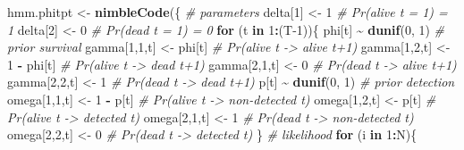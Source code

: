 \documentclass[
  12pt,
]{krantz}
\newenvironment{Shaded}{\begin{snugshade}}{\end{snugshade}}
\newcommand{\CommentTok}[1]{\textcolor[rgb]{0.56,0.35,0.01}{\textit{#1}}}
\newcommand{\ControlFlowTok}[1]{\textcolor[rgb]{0.13,0.29,0.53}{\textbf{#1}}}
\newcommand{\DecValTok}[1]{\textcolor[rgb]{0.00,0.00,0.81}{#1}}
\newcommand{\FunctionTok}[1]{\textcolor[rgb]{0.13,0.29,0.53}{\textbf{#1}}}
\newcommand{\NormalTok}[1]{#1}
\newcommand{\OtherTok}[1]{\textcolor[rgb]{0.56,0.35,0.01}{#1}}
\newcommand{\SpecialCharTok}[1]{\textcolor[rgb]{0.81,0.36,0.00}{\textbf{#1}}}
\begin{document}
\begin{Shaded}
\begin{Highlighting}[]
\NormalTok{hmm.phitpt }\OtherTok{\textless{}{-}} \FunctionTok{nimbleCode}\NormalTok{(\{}
  \CommentTok{\# parameters}
\NormalTok{  delta[}\DecValTok{1}\NormalTok{] }\OtherTok{\textless{}{-}} \DecValTok{1}          \CommentTok{\# Pr(alive t = 1) = 1}
\NormalTok{  delta[}\DecValTok{2}\NormalTok{] }\OtherTok{\textless{}{-}} \DecValTok{0}          \CommentTok{\# Pr(dead t = 1) = 0}
  \ControlFlowTok{for}\NormalTok{ (t }\ControlFlowTok{in} \DecValTok{1}\SpecialCharTok{:}\NormalTok{(T}\DecValTok{{-}1}\NormalTok{))\{}
\NormalTok{    phi[t] }\SpecialCharTok{\textasciitilde{}} \FunctionTok{dunif}\NormalTok{(}\DecValTok{0}\NormalTok{, }\DecValTok{1}\NormalTok{) }\CommentTok{\# prior survival}
\NormalTok{    gamma[}\DecValTok{1}\NormalTok{,}\DecValTok{1}\NormalTok{,t] }\OtherTok{\textless{}{-}}\NormalTok{ phi[t]      }\CommentTok{\# Pr(alive t {-}\textgreater{} alive t+1)}
\NormalTok{    gamma[}\DecValTok{1}\NormalTok{,}\DecValTok{2}\NormalTok{,t] }\OtherTok{\textless{}{-}} \DecValTok{1} \SpecialCharTok{{-}}\NormalTok{ phi[t]  }\CommentTok{\# Pr(alive t {-}\textgreater{} dead t+1)}
\NormalTok{    gamma[}\DecValTok{2}\NormalTok{,}\DecValTok{1}\NormalTok{,t] }\OtherTok{\textless{}{-}} \DecValTok{0}        \CommentTok{\# Pr(dead t {-}\textgreater{} alive t+1)}
\NormalTok{    gamma[}\DecValTok{2}\NormalTok{,}\DecValTok{2}\NormalTok{,t] }\OtherTok{\textless{}{-}} \DecValTok{1}        \CommentTok{\# Pr(dead t {-}\textgreater{} dead t+1)}
\NormalTok{    p[t] }\SpecialCharTok{\textasciitilde{}} \FunctionTok{dunif}\NormalTok{(}\DecValTok{0}\NormalTok{, }\DecValTok{1}\NormalTok{) }\CommentTok{\# prior detection}
\NormalTok{    omega[}\DecValTok{1}\NormalTok{,}\DecValTok{1}\NormalTok{,t] }\OtherTok{\textless{}{-}} \DecValTok{1} \SpecialCharTok{{-}}\NormalTok{ p[t]    }\CommentTok{\# Pr(alive t {-}\textgreater{} non{-}detected t)}
\NormalTok{    omega[}\DecValTok{1}\NormalTok{,}\DecValTok{2}\NormalTok{,t] }\OtherTok{\textless{}{-}}\NormalTok{ p[t]        }\CommentTok{\# Pr(alive t {-}\textgreater{} detected t)}
\NormalTok{    omega[}\DecValTok{2}\NormalTok{,}\DecValTok{1}\NormalTok{,t] }\OtherTok{\textless{}{-}} \DecValTok{1}        \CommentTok{\# Pr(dead t {-}\textgreater{} non{-}detected t)}
\NormalTok{    omega[}\DecValTok{2}\NormalTok{,}\DecValTok{2}\NormalTok{,t] }\OtherTok{\textless{}{-}} \DecValTok{0}        \CommentTok{\# Pr(dead t {-}\textgreater{} detected t)}
\NormalTok{  \}}
  \CommentTok{\# likelihood}
  \ControlFlowTok{for}\NormalTok{ (i }\ControlFlowTok{in} \DecValTok{1}\SpecialCharTok{:}\NormalTok{N)\{}

\end{Highlighting}
\end{Shaded}
\end{document}
